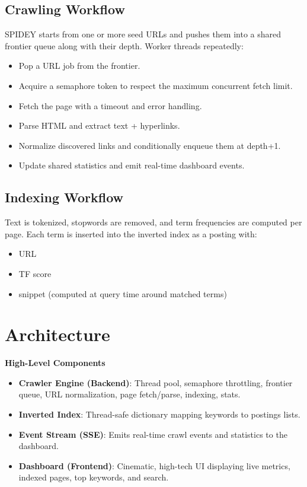 \documentclass[11pt,a4paper]{article}
\begin{document}
\subsection{Crawling Workflow}
SPIDEY starts from one or more seed URLs and pushes them into a shared frontier queue along with their depth. Worker threads repeatedly:
\begin{itemize}
  \item Pop a URL job from the frontier.
  \item Acquire a semaphore token to respect the maximum concurrent fetch limit.
  \item Fetch the page with a timeout and error handling.
  \item Parse HTML and extract text + hyperlinks.
  \item Normalize discovered links and conditionally enqueue them at depth+1.
  \item Update shared statistics and emit real-time dashboard events.
\end{itemize}

\subsection{Indexing Workflow}
Text is tokenized, stopwords are removed, and term frequencies are computed per page. Each term is inserted into the inverted index as a posting with:
\begin{itemize}
  \item URL
  \item TF score
  \item snippet (computed at query time around matched terms)
\end{itemize}

\section{Architecture}
\begin{tcolorbox}[
  colback=spideygray!4,
  colframe=spideyred,
  arc=8pt,
  boxrule=0.9pt
]
\textbf{High-Level Components}
\begin{itemize}
  \item \textbf{Crawler Engine (Backend)}: Thread pool, semaphore throttling, frontier queue, URL normalization, page fetch/parse, indexing, stats.
  \item \textbf{Inverted Index}: Thread-safe dictionary mapping keywords to postings lists.
  \item \textbf{Event Stream (SSE)}: Emits real-time crawl events and statistics to the dashboard.
  \item \textbf{Dashboard (Frontend)}: Cinematic, high-tech UI displaying live metrics, indexed pages, top keywords, and search.
\end{itemize}
\end{tcolorbox}
\end{document}
